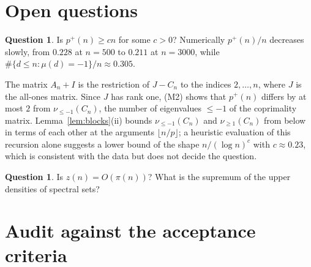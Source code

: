 \documentclass[11pt]{amsart}
\theoremstyle{definition}
\newtheorem{question}[theorem]{Question}
\theoremstyle{remark}
\newcommand{\pp}{p^{+}}
\newcommand{\nuge}[1]{\nu_{\ge #1}}
\newcommand{\nule}[1]{\nu_{\le #1}}
\begin{document}
\section{Open questions}\label{sec:open}

\begin{question}
Is $\pp(n)\ge cn$ for some $c>0$? Numerically $\pp(n)/n$ decreases slowly, from $0.228$ at $n=500$ to $0.211$ at $n=3000$, while $\#\{d\le n:\mu(d)=-1\}/n\approx0.305$.
\end{question}

The matrix $A_n+I$ is the restriction of $J-C_n$ to the indices $2,\dots,n$, where $J$ is the all-ones matrix. Since $J$ has rank one, (M2) shows that $\pp(n)$ differs by at most $2$ from $\nule{-1}(C_n)$, the number of eigenvalues $\le-1$ of the coprimality matrix. Lemma~\ref{lem:blocks}(ii) bounds $\nule{-1}(C_n)$ and $\nuge1(C_n)$ from below in terms of each other at the arguments $\lfloor n/p\rfloor$; a heuristic evaluation of this recursion alone suggests a lower bound of the shape $n/(\log n)^{c}$ with $c\approx0.23$, which is consistent with the data but does not decide the question.

\begin{question}
Is $z(n)=O(\pi(n))$? What is the supremum of the upper densities of spectral sets?
\end{question}

\section{Audit against the acceptance criteria}
\end{document}
